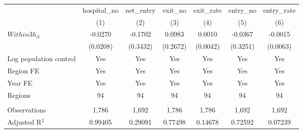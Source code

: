 \begingroup
\centering
\begin{tabular}{lcccccc}
   \toprule
                          & hospital\_no  & net\_entry  & exit\_no  & exit\_rate  & entry\_no  & entry\_rate \\    
                          & (1)           & (2)         & (3)       & (4)         & (5)        & (6)\\  
   \midrule 
   $Within3h_{it}$        & -0.0270       & -0.1702     & 0.0983    & 0.0010      & -0.0367    & -0.0015\\   
                          & (0.0208)      & (0.3432)    & (0.2672)  & (0.0042)    & (0.3251)   & (0.0063)\\   
   Log population control & Yes           & Yes         & Yes       & Yes         & Yes        & Yes\\  
   Region FE              & Yes           & Yes         & Yes       & Yes         & Yes        & Yes\\  
   Year FE                & Yes           & Yes         & Yes       & Yes         & Yes        & Yes\\  
   Regions                & 94            & 94          & 94        & 94          & 94         & 94\\  
    \\
   Observations           & 1,786         & 1,692       & 1,786     & 1,786       & 1,692      & 1,692\\  
   Adjusted R$^2$         & 0.99405       & 0.29091     & 0.77498   & 0.14678     & 0.72592    & 0.07239\\  
   \bottomrule
\end{tabular}
\par\endgroup
